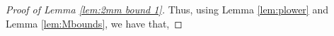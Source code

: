 \documentclass[12pt,reqno]{amsart}
\makeatletter
\numberwithin{equation}{section}
\newcounter{Ccnt}
\newcommand\Co[1]{%
\@ifundefined{C-#1}%
  {\stepcounter{Ccnt}\expandafter\xdef\csname C-#1\endcsname{\arabic{Ccnt}}}%
  {}%
C_{\csname C-#1\endcsname}}
\theoremstyle{definition}
\renewcommand{\[}{\begin{equation}}
\renewcommand{\]}{\end{equation}}
\renewcommand{\|}{\bigg{|}}
\newcommand{\err}{c}
\makeatother
\begin{document}
\begin{proof}[Proof of Lemma \ref{lem:2mm bound 1}]
Thus, using Lemma \ref{lem:plower} and Lemma \ref{lem:Mbounds}, we have that,
%
%
%
%
%

\end{proof}
\end{document}
